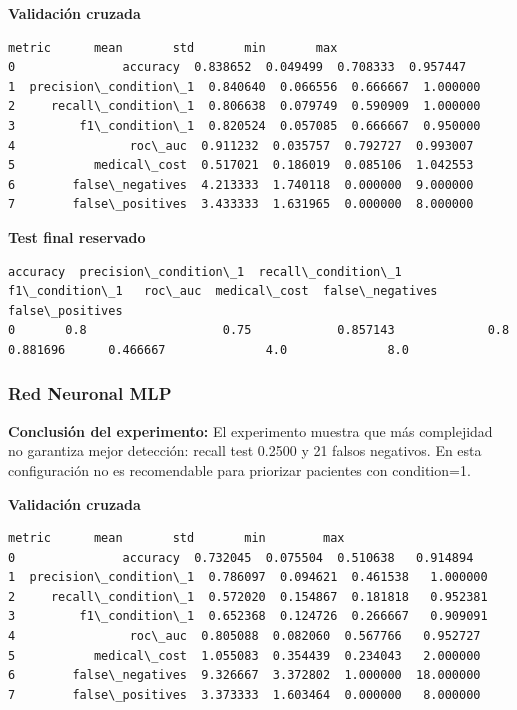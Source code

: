 \documentclass[11pt]{article}
\begin{document}
    
    \textbf{Validación cruzada}

    
    
    \begin{Verbatim}[commandchars=\\\{\}]
                  metric      mean       std       min       max
0               accuracy  0.838652  0.049499  0.708333  0.957447
1  precision\_condition\_1  0.840640  0.066556  0.666667  1.000000
2     recall\_condition\_1  0.806638  0.079749  0.590909  1.000000
3         f1\_condition\_1  0.820524  0.057085  0.666667  0.950000
4                roc\_auc  0.911232  0.035757  0.792727  0.993007
5           medical\_cost  0.517021  0.186019  0.085106  1.042553
6        false\_negatives  4.213333  1.740118  0.000000  9.000000
7        false\_positives  3.433333  1.631965  0.000000  8.000000
    \end{Verbatim}

    
    \textbf{Test final reservado}

    
    
    \begin{Verbatim}[commandchars=\\\{\}]
   accuracy  precision\_condition\_1  recall\_condition\_1  f1\_condition\_1   roc\_auc  medical\_cost  false\_negatives  false\_positives
0       0.8                   0.75            0.857143             0.8  0.881696      0.466667              4.0              8.0
    \end{Verbatim}

    
    \subsubsection{Red Neuronal MLP}\label{red-neuronal-mlp}

    
    \textbf{Conclusión del experimento:} El experimento muestra que más
complejidad no garantiza mejor detección: recall test 0.2500 y 21 falsos
negativos. En esta configuración no es recomendable para priorizar
pacientes con condition=1.

    
    \textbf{Validación cruzada}

    
    
    \begin{Verbatim}[commandchars=\\\{\}]
                  metric      mean       std       min        max
0               accuracy  0.732045  0.075504  0.510638   0.914894
1  precision\_condition\_1  0.786097  0.094621  0.461538   1.000000
2     recall\_condition\_1  0.572020  0.154867  0.181818   0.952381
3         f1\_condition\_1  0.652368  0.124726  0.266667   0.909091
4                roc\_auc  0.805088  0.082060  0.567766   0.952727
5           medical\_cost  1.055083  0.354439  0.234043   2.000000
6        false\_negatives  9.326667  3.372802  1.000000  18.000000
7        false\_positives  3.373333  1.603464  0.000000   8.000000
    \end{Verbatim}
\end{document}

